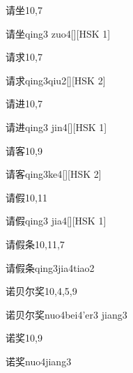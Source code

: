 \begin{entry}{请坐}{10,7}
  \begin{phonetics}{请坐}{qing3 zuo4}[][HSK 1]
  \end{phonetics}
\end{entry}

\begin{entry}{请求}{10,7}
  \begin{phonetics}{请求}{qing3qiu2}[][HSK 2]
  \end{phonetics}
\end{entry}

\begin{entry}{请进}{10,7}
  \begin{phonetics}{请进}{qing3 jin4}[][HSK 1]
  \end{phonetics}
\end{entry}

\begin{entry}{请客}{10,9}
  \begin{phonetics}{请客}{qing3ke4}[][HSK 2]
  \end{phonetics}
\end{entry}

\begin{entry}{请假}{10,11}
  \begin{phonetics}{请假}{qing3 jia4}[][HSK 1]
  \end{phonetics}
\end{entry}

\begin{entry}{请假条}{10,11,7}
  \begin{phonetics}{请假条}{qing3jia4tiao2}
  \end{phonetics}
\end{entry}

\begin{entry}{诺贝尔奖}{10,4,5,9}
  \begin{phonetics}{诺贝尔奖}{nuo4bei4'er3 jiang3}
  \end{phonetics}
\end{entry}

\begin{entry}{诺奖}{10,9}
  \begin{phonetics}{诺奖}{nuo4jiang3}
  \end{phonetics}
\end{entry}

